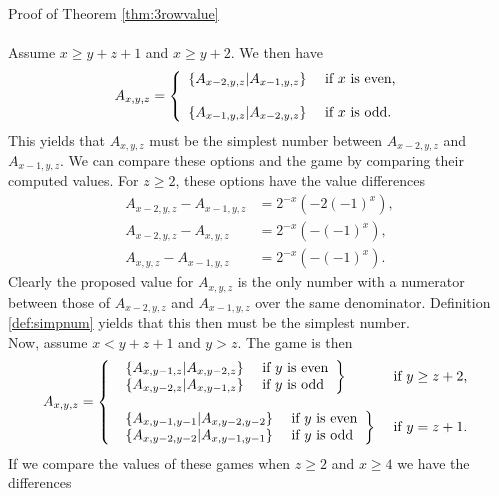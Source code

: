 \begin{proof2}{Proof of Theorem \ref{thm:3rowvalue}}
\\\\
Assume $x\ge y+z+1$ and $x\ge y+2$. We then have
\begin{equation*}
A_{x,y,z}=\left\{
\begin{array}{l l}
\left\{A_{x-2,y,z}\middle|A_{x-1,y,z}\right\}&\text{ if $x$ is even,}\\
~&~\\
\left\{A_{x-1,y,z}\middle|A_{x-2,y,z}\right\}&\text{ if $x$ is odd.}
\end{array}\right.
\end{equation*}
This yields that $A_{x,y,z}$ must be the simplest number between $A_{x-2,y,z}$ and $A_{x-1,y,z}$. We can compare these options and the game by comparing their computed values. For $z\ge2$, these options have the value differences
\begin{align*}
A_{x-2,y,z}-A_{x-1,y,z}&=2^{-x}\left(-2(-1)^x\right),\\
A_{x-2,y,z}-A_{x,y,z}&=2^{-x}\left(-(-1)^x\right),\\
A_{x,y,z}-A_{x-1,y,z}&=2^{-x}\left(-(-1)^x\right).
\end{align*}
Clearly the proposed value for $A_{x,y,z}$ is the only number with a numerator between those of $A_{x-2,y,z}$ and $A_{x-1,y,z}$ over the same denominator. Definition \ref{def:simpnum} yields that this then must be the simplest number.
\\
Now, assume $x<y+z+1$ and $y>z$. The game is then
\begin{align*}
A_{x,y,z}=\left\{
\begin{array}{l l}
\left.\begin{array}{l l}
\left\{A_{x,y-1,z}\middle|A_{x,y-2,z}\right\}&\text{ if $y$ is even}\\
\left\{A_{x,y-2,z}\middle|A_{x,y-1,z}\right\}&\text{ if $y$ is odd}
\end{array}\right\}&\text{ if $y\ge z+2$,}\\
~\\
\left.\begin{array}{l l}
\left\{A_{x,y-1,y-1}\middle|A_{x,y-2,y-2}\right\}&\text{ if $y$ is even}\\
\left\{A_{x,y-2,y-2}\middle|A_{x,y-1,y-1}\right\}&\text{ if $y$ is odd}
\end{array}\right\}&\text{ if $y=z+1$.}\\
\end{array}
\right.
\end{align*}
If we compare the values of these games when $z\ge2$ and $x\ge4$ we have the differences

\end{proof2}

